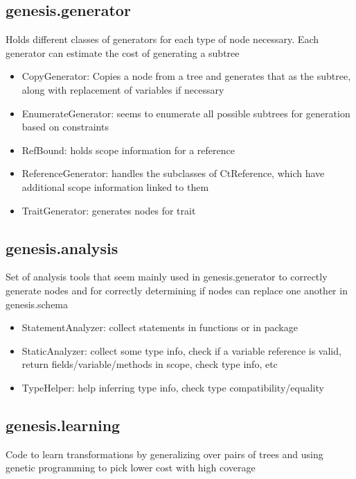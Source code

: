 \documentclass{article}
\begin{document}
\subsection{genesis.generator}
Holds different classes of generators for each type of node necessary. Each generator can estimate the cost
of generating a subtree

\begin{itemize}
	\item CopyGenerator: Copies a node from a tree and generates that as the subtree, along with replacement of variables if necessary
	\item EnumerateGenerator: seems to enumerate all possible subtrees for generation based on constraints
	\item RefBound: holds scope information for a reference
	\item ReferenceGenerator: handles the subclasses of CtReference, which have additional scope information linked to them
	\item TraitGenerator: generates nodes for trait
\end{itemize}


\subsection{genesis.analysis}
Set of analysis tools that seem mainly used in genesis.generator to correctly generate nodes and
for correctly determining if nodes can replace one another in genesis.schema
  
\begin{itemize} 
	\item StatementAnalyzer: collect statements in functions or in package
	\item StaticAnalyzer: collect some type info, check if a variable reference is valid, return fields/variable/methods in scope,
  check type info, etc
	\item TypeHelper: help inferring type info, check type compatibility/equality
\end{itemize}


\subsection{genesis.learning}
Code to learn transformations by generalizing over pairs of trees and using genetic programming to pick lower cost with high coverage
\end{document}
